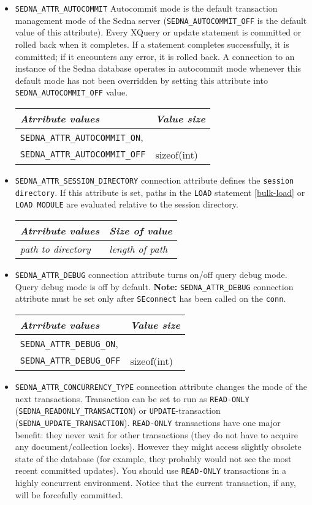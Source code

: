 \documentclass[a4paper,12pt]{article}
\begin{document}
\begin{itemize}
\item\verb!SEDNA_ATTR_AUTOCOMMIT! Autocommit mode is the default transaction
management mode of the Sedna server (\verb!SEDNA_AUTOCOMMIT_OFF! is the default
value of this attribute). Every XQuery or update statement is committed or
rolled back when it completes. If a statement completes successfully, it is
committed; if it encounters any error, it is rolled back. A connection to an
instance of the Sedna database operates in autocommit mode whenever this default
mode has not been overridden by setting this attribute into
\verb!SEDNA_AUTOCOMMIT_OFF! value.

\begin{tabular}{|l|l|}
\hline
\emph{Atrribute values} & \emph{Value size} \\
\hline
\verb!SEDNA_ATTR_AUTOCOMMIT_ON!, & \\
\verb!SEDNA_ATTR_AUTOCOMMIT_OFF! & sizeof(int) \\
\hline
\end{tabular}

\item\verb!SEDNA_ATTR_SESSION_DIRECTORY! connection attribute defines the
\verb!session directory!. If this attribute is set, paths in the \verb!LOAD!
statement \ref{bulk-load} or \verb!LOAD MODULE! are evaluated relative to the
session directory.

\begin{tabular}{|l|l|}
\hline
\emph{Atrribute values} & \emph{Size of value} \\
\hline
\emph{path to directory} & \emph{length of path} \\
\hline
\end{tabular}

\item\verb!SEDNA_ATTR_DEBUG! connection attribute turns on/off query debug
mode. Query debug mode is off by default. \textbf{Note:} \verb!SEDNA_ATTR_DEBUG!
connection attribute must be set only after \verb!SEconnect! has been called on
the \verb!conn!.

\begin{tabular}{|l|l|}
\hline
\emph{Atrribute values} & \emph{Value size} \\
\hline
\verb!SEDNA_ATTR_DEBUG_ON!, & \\
\verb!SEDNA_ATTR_DEBUG_OFF! & sizeof(int) \\
\hline
\end{tabular}

\item\verb!SEDNA_ATTR_CONCURRENCY_TYPE! connection attribute changes the
mode of the next transactions. Transaction can be set to run as \verb!READ-ONLY!
(\verb!SEDNA_READONLY_TRANSACTION!) or \verb!UPDATE!-transaction
(\verb!SEDNA_UPDATE_TRANSACTION!). \verb!READ-ONLY! transactions have one major
benefit: they never wait for other transactions (they do not have to acquire any
document/collection locks). However they might access slightly obsolete state of
the database (for example, they probably would not see the most recent committed
updates). You should use \verb!READ-ONLY! transactions in a highly concurrent
environment. Notice that the current transaction, if any, will be forcefully
committed.


\end{itemize}
\end{document}
